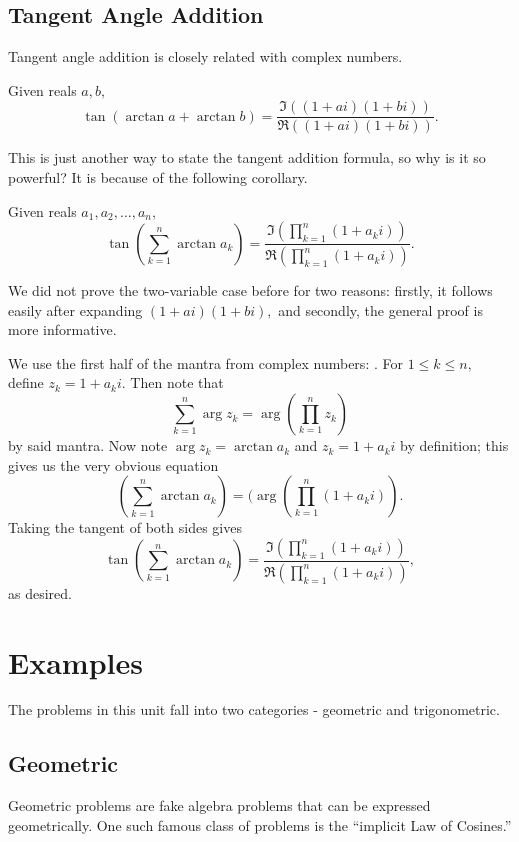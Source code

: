 \documentclass[mast]{lucky}
\begin{document}
\subsection{Tangent Angle Addition}

Tangent angle addition is closely related with complex numbers.

\begin{theo}
Given reals $a,b,$
\[\tan(\arctan a + \arctan b)=\frac{\Im\left((1+ai)(1+bi)\right)}{\Re\left((1+ai)(1+bi)\right)}.\]
\end{theo}

This is just another way to state the tangent addition formula, so why is it so powerful? It is because of the following corollary.

\begin{corollary}
Given reals $a_1,a_2,\ldots,a_n,$
\[\tan\left(\sum_{k=1}^n \arctan a_k\right) = \frac{\Im\left(\prod\limits_{k=1}^n (1+a_ki)\right)}{\Re\left(\prod\limits_{k=1}^n (1+a_ki)\right)}.\]
\end{corollary}

We did not prove the two-variable case before for two reasons: firstly, it follows easily after expanding $(1+ai)(1+bi),$ and secondly, the general proof is more informative.

\begin{pro}
We use the first half of the mantra from complex numbers: . For $1\leq k\leq n,$ define $z_k=1+a_ki.$ Then note that
\[\sum_{k=1}^n\arg z_k=\arg\left(\prod\limits_{k=1}^n z_k\right)\]
by said mantra. Now note $\arg z_k=\arctan a_k$ and $z_k=1+a_ki$ by definition; this gives us the very obvious equation
\[\left(\sum_{k=1}^n \arctan a_k\right) = (\arg\left(\prod\limits_{k=1}^n (1+a_ki)\right).\]
Taking the tangent of both sides gives
\[\tan\left(\sum_{k=1}^n \arctan a_k\right) = \frac{\Im\left(\prod\limits_{k=1}^n (1+a_ki)\right)}{\Re\left(\prod\limits_{k=1}^n (1+a_ki)\right)},\]
as desired.
\end{pro}

\pagebreak

\section{Examples}
The problems in this unit fall into two categories - geometric and trigonometric.

\subsection{Geometric}
Geometric problems are fake algebra problems that can be expressed geometrically. One such famous class of problems is the ``implicit Law of Cosines.''
\end{document}
